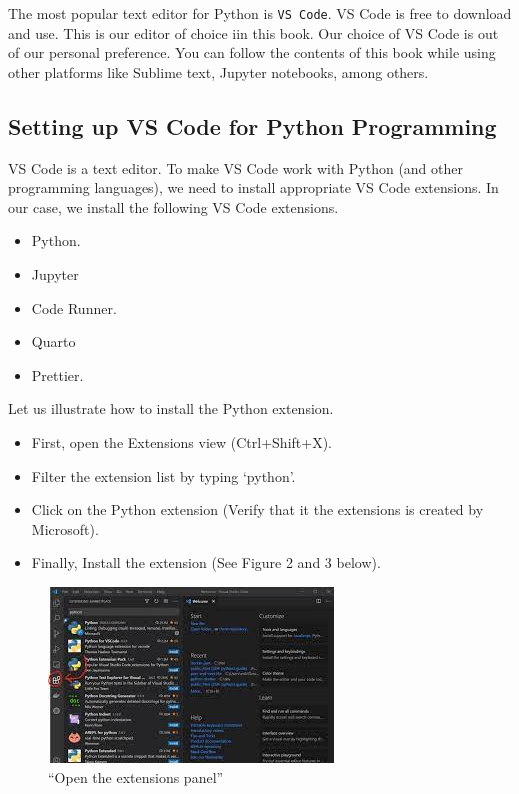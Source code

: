 \documentclass[
  letterpaper,
  DIV=11,
  numbers=noendperiod]{scrreprt}
\providecommand{\tightlist}{%
  \setlength{\itemsep}{0pt}\setlength{\parskip}{0pt}}\usepackage{longtable,booktabs,array}
\begin{document}
The most popular text editor for Python is \texttt{VS\ Code}. VS Code is
free to download and use. This is our editor of choice iin this book.
Our choice of VS Code is out of our personal preference. You can follow
the contents of this book while using other platforms like Sublime text,
Jupyter notebooks, among others.

\hypertarget{setting-up-vs-code-for-python-programming}{%
\subsection{Setting up VS Code for Python
Programming}\label{setting-up-vs-code-for-python-programming}}

VS Code is a text editor. To make VS Code work with Python (and other
programming languages), we need to install appropriate VS Code
extensions. In our case, we install the following VS Code extensions.

\begin{itemize}
\tightlist
\item
  Python.
\item
  Jupyter
\item
  Code Runner.
\item
  Quarto
\item
  Prettier.
\end{itemize}

Let us illustrate how to install the Python extension.

\begin{itemize}
\tightlist
\item
  First, open the Extensions view (Ctrl+Shift+X).
\item
  Filter the extension list by typing `python'.
\item
  Click on the Python extension (Verify that it the extensions is
  created by Microsoft).
\item
  Finally, Install the extension (See Figure 2 and 3 below).
\end{itemize}

\begin{figure}

{\centering \includegraphics{"images/vs_ext.jpeg"}

}

\caption{``Open the extensions panel''}

\end{figure}
\end{document}
